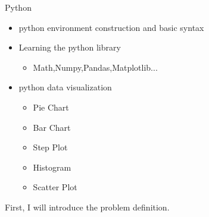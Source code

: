 \documentclass[
 size=12pt,
 paper=smartboard,  %
 mode=present, 		%
 display=slides, 	%
 style=tuliplab,  	%
 pauseslide,
 fleqn,leqno]{powerdot}
\begin{document}
\begin{slide}{Python}
  \begin{center}
  \begin{itemize}
    \item
    python environment construction and basic syntax
    \item
    Learning the python library
    \begin{itemize}
      \item
      Math,Numpy,Pandas,Matplotlib...
    \end{itemize}
    \item
    python data visualization
    \begin{itemize}
      \item
      Pie Chart 
      \item
      Bar Chart
      \item
      Step Plot
      \item
      Histogram
      \item
      Scatter Plot
    \end{itemize}
  \end{itemize}
  \end{center}
  \begin{note}
  First, I will introduce the problem definition.
  \end{note}
  
  \end{slide}





\end{document}
